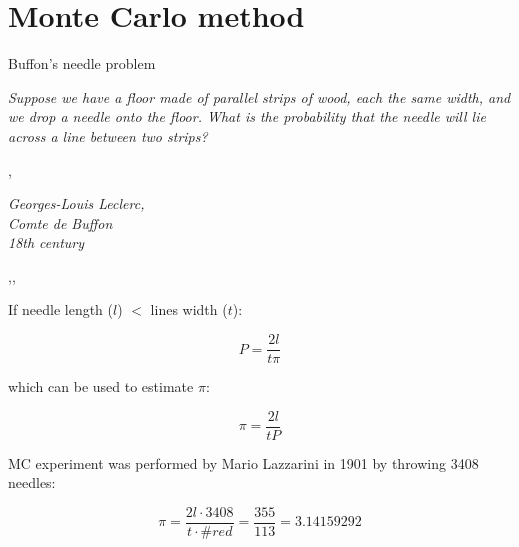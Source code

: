 \section{Monte Carlo method}

\begin{wideslide}{Buffon's needle problem}
\null\vfill

  \twocolumn
  {
    {\it Suppose we have a floor made of parallel strips of wood, each the same width, and we drop a needle onto the floor. What is the probability that the needle will lie across a line between two strips?}
    
    \sep
    
    {\it\hfill Georges-Louis Leclerc,\\\hfill Comte de Buffon\\\hfill 18th century}
  }
  {
    \sep\sep
    \centering
  }
  
  \vspace{-10pt}
  
  \twocolumn
  {
    If needle length ($l$) $<$ lines width ($t$):
    
    $$P = \frac{2l}{t\pi}$$
    
    which can be used to estimate $\pi$:
    
    $$\pi = \frac{2l}{tP}$$
  }
  {
    MC experiment was performed by Mario Lazzarini in 1901 by throwing 3408 needles:
    
    $$\pi = \frac{2l \cdot 3408}{t \cdot \#red} = \frac{355}{113} = 3.14159292$$
  }
  
\vfill\null
\end{wideslide}

